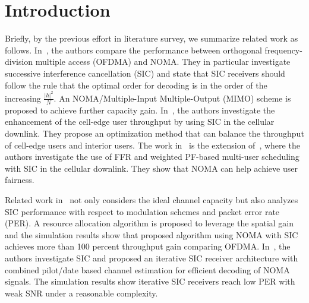 \section{Introduction}
\label{sec_introduction}
%
%

Briefly, by the previous effort in literature survey, we summarize related work
as follows.
In~\cite{cite_docomo1}, the authors compare the performance between orthogonal 
frequency-division multiple access (OFDMA) and NOMA. They in particular
investigate successive interference cancellation (SIC) and state that
SIC receivers should follow the rule that the optimal order for decoding
is in the order of the increasing $\frac{|h|^2}{N}$. An NOMA/Multiple-Input
Multiple-Output (MIMO) scheme is proposed to achieve further capacity gain.
In~\cite{cite_docomo2}, the authors investigate the enhancement of the
cell-edge user throughput by using SIC in  the cellular downlink. They
propose an optimization method that can balance the throughput of cell-edge
users and interior users. The work in~\cite{cite_docomo3} is the extension
of~\cite{cite_docomo2}, where the authors investigate the use of FFR and
weighted PF-based multi-user scheduling with SIC in the cellular downlink.
They show that NOMA can help achieve user fairness.
%
%

Related work in~\cite{cite_bell1} not only considers the ideal channel
capacity but also analyzes SIC performance with respect to modulation schemes
and packet error rate (PER). A resource allocation algorithm is proposed to
leverage the spatial gain and the simulation results show that
proposed algorithm using NOMA with SIC achieves more than 100 percent throughput
gain comparing OFDMA. In~\cite{cite_bell2}, the authors investigate SIC and
proposed an iterative SIC receiver architecture with combined pilot/date based
channel estimation for efficient decoding of NOMA signals. The simulation
results show iterative SIC receivers reach low PER with weak SNR under a
reasonable complexity.

